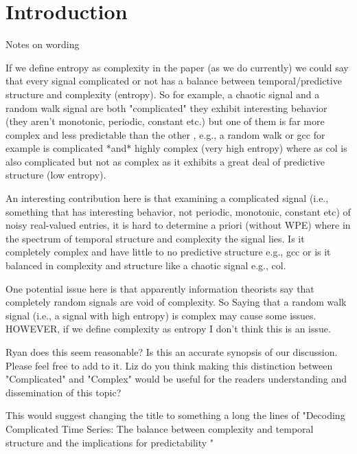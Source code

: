 \section{Introduction}\label{sec:intro}


Notes on wording 

 If we define entropy as complexity in the paper (as we do currently) we could say that every signal complicated or not has a balance between temporal/predictive structure and complexity (entropy). So for example, a chaotic signal and a random walk signal are both "complicated" they exhibit interesting behavior (they aren't monotonic, periodic, constant etc.) but one of them is far more complex and less predictable than the other , e.g.,  a random walk or gcc for example is complicated *and* highly complex (very high entropy) where as col is also complicated but not as complex as it exhibits a great deal of predictive structure (low entropy).

An interesting contribution here is that examining a complicated signal (i.e., something that has interesting behavior, not periodic, monotonic, constant etc) of noisy real-valued entries, it is hard to determine a priori (without WPE) where in the spectrum of temporal structure and complexity the signal lies. Is it completely complex and have little to no predictive structure e.g., gcc or is it balanced in complexity and structure like a chaotic signal e.g., col.

One potential issue here is that apparently information theorists say that completely random signals are void of complexity. So Saying that a random walk signal (i.e., a signal with high entropy) is complex may cause some issues. HOWEVER, if we define complexity as entropy I don't think this is an issue. 

Ryan does this seem reasonable? Is this an accurate synopsis of our discussion. Please feel free to add to it. Liz do you think making this distinction between "Complicated" and "Complex" would be useful for the readers understanding and dissemination of this topic?

This would suggest changing the title to something a long the lines of "Decoding Complicated Time Series: The balance between complexity and temporal structure and the implications for predictability "



